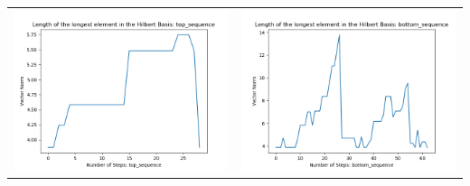 \documentclass[10pt]{article}
\begin{document}
\begin{tabular}{c|c}
\begin{minipage}{.45\textwidth}
\includegraphics[width=\textwidth]{"DATA/4d/5 generators 2 bound F/top_sequence LENGTH"}
\end{minipage} &
\begin{minipage}{.45\textwidth}
\includegraphics[width=\textwidth]{"DATA/4d/5 generators 2 bound F bottomup/bottom_sequence LENGTH"}
\end{minipage}
\end{tabular}
\end{document}
